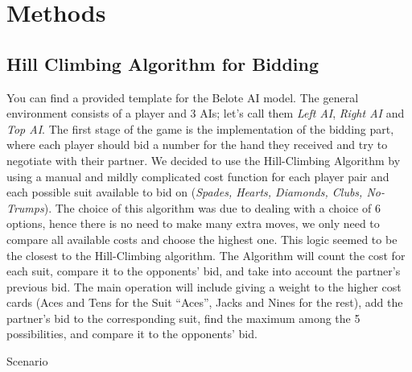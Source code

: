 \section{Methods}\label{ModelDescription}
\subsection{Hill Climbing Algorithm for Bidding}
\hspace{\parindent}You can find a provided template for the Belote AI model.
The general environment consists of a player and 3 AIs; let’s call them \textit{Left
AI}, \textit{Right AI} and \textit{Top AI}. The first stage of the game is the implementation of
the bidding part, where each player should bid a number for the hand they received
and try to negotiate with their partner. We decided to use the Hill-Climbing Algorithm by
using a manual and mildly complicated cost function for each player pair and each
possible suit available to bid on (\textit{Spades, Hearts, Diamonds, Clubs, No-Trumps}). The choice
of this algorithm was due to dealing with a choice of 6 options, hence there is no need
to make many extra moves, we only need to compare all available costs and choose the highest one.
This logic seemed to be the closest to the Hill-Climbing algorithm.
The Algorithm will count the cost for each suit, compare it to the opponents’
bid, and take into account the partner’s previous bid. The main operation will include
giving a weight to the higher cost cards (Aces and Tens for the Suit “Aces”, Jacks and
Nines for the rest), add the partner’s bid to the corresponding suit, find the maximum
among the 5 possibilities, and compare it to the opponents’ bid.
\par Scenario

